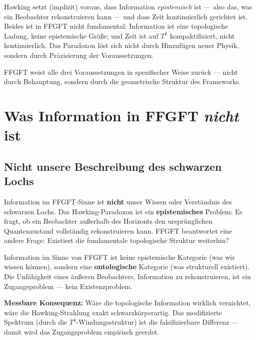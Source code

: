 \begin{wichtig}
Hawking setzt (implizit) voraus, dass Information \emph{epistemisch} ist --- also das, was ein Beobachter rekonstruieren kann --- und dass Zeit kontinuierlich gerichtet ist. Beides ist in FFGFT nicht fundamental: Information ist eine topologische Ladung, keine epistemische Größe; und Zeit ist auf $T^4$ kompaktifiziert, nicht kontinuierlich. Das Paradoxon löst sich nicht durch Hinzufügen neuer Physik, sondern durch Präzisierung der Voraussetzungen.
\end{wichtig}

FFGFT weist alle drei Voraussetzungen in spezifischer Weise zurück --- nicht durch Behauptung, sondern durch die geometrische Struktur des Frameworks.

\section{Was Information in FFGFT \emph{nicht} ist}

\subsection{Nicht unsere Beschreibung des schwarzen Lochs}

Information im FFGFT-Sinne ist \textbf{nicht} unser Wissen oder Verständnis des schwarzen Lochs. Das Hawking-Paradoxon ist ein \textbf{epistemisches} Problem: Es fragt, ob ein Beobachter außerhalb des Horizonts den ursprünglichen Quantenzustand vollständig rekonstruieren kann. FFGFT beantwortet eine andere Frage: Existiert die fundamentale topologische Struktur weiterhin?

\begin{wichtig}
Information im Sinne von FFGFT ist keine epistemische Kategorie (was wir wissen können), sondern eine \textbf{ontologische} Kategorie (was strukturell existiert). Die Unfähigkeit eines äußeren Beobachters, Information zu rekonstruieren, ist ein Zugangsproblem --- kein Existenzproblem.

\textbf{Messbare Konsequenz:} Wäre die topologische Information wirklich vernichtet, wäre die Hawking-Strahlung exakt schwarzkörperartig. Das modifizierte Spektrum (durch die $T^4$-Windungsstruktur) ist die falsifizierbare Differenz --- damit wird das Zugangsproblem empirisch geerdet.
\end{wichtig}

